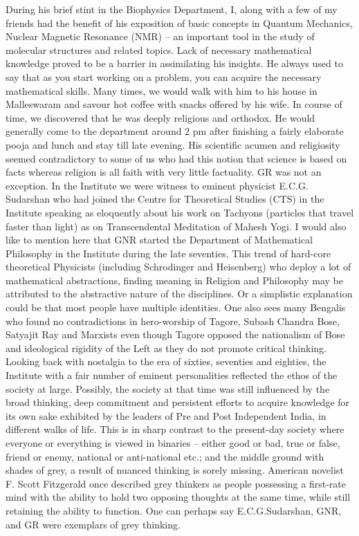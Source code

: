 During his brief stint in the Biophysics Department, I, along with a few of my friends had the benefit of his exposition of basic concepts in Quantum Mechanics, Nuclear Magnetic Resonance (NMR) – an important tool in the study of molecular structures and related topics. Lack of necessary mathematical knowledge proved to be a barrier in assimilating his insights. He always used to say that as you start working on a problem, you can acquire the necessary mathematical skills. Many times, we would walk with him to his house in Malleswaram and savour hot coffee with snacks offered by his wife. In course of time, we discovered that he was deeply religious and orthodox. He would generally come to the department around 2 pm after finishing a fairly elaborate pooja and lunch and stay till late evening. His scientific acumen and religiosity seemed contradictory to some of us who had this notion that science is based on facts whereas religion is all faith with very little factuality. GR was not an exception. In the Institute we were witness to eminent physicist E.C.G. Sudarshan who had joined the Centre for Theoretical Studies (CTS) in the Institute speaking as eloquently about his work on Tachyons (particles that travel faster than light) as on Transcendental Meditation of Mahesh Yogi.  I would also like to mention here that GNR started the Department of Mathematical Philosophy in the Institute during the late seventies. This trend of hard-core theoretical Physicists (including Schrodinger and Heisenberg) who deploy a lot of mathematical abstractions, finding meaning in Religion and Philosophy may be attributed to the abstractive nature of the disciplines. Or a simplistic explanation could be that most people have multiple identities. One also sees many Bengalis who found no contradictions in hero-worship of Tagore, Subash Chandra Bose, Satyajit Ray and Marxists even though Tagore opposed the nationalism of Bose and ideological rigidity of the Left as they do not promote critical thinking. Looking back with nostalgia to the era of sixties, seventies and eighties, the Institute with a fair number of eminent personalities reflected the ethos of the society at large. Possibly, the society at that time was still influenced by the broad thinking, deep commitment and persistent efforts to acquire knowledge for its own sake exhibited by the leaders of Pre and Post Independent India, in different walks of life. This is in sharp contrast to the present-day society where everyone or everything is viewed in binaries – either good or bad, true or false, friend or enemy, national or anti-national etc.; and the middle ground with shades of grey, a result of nuanced thinking is sorely missing.  American novelist F. Scott Fitzgerald once described grey thinkers as people possessing a first-rate mind with the ability to hold two opposing thoughts at the same time, while still retaining the ability to function. One can perhaps say E.C.G.Sudarshan, GNR, and GR were exemplars of grey thinking.

